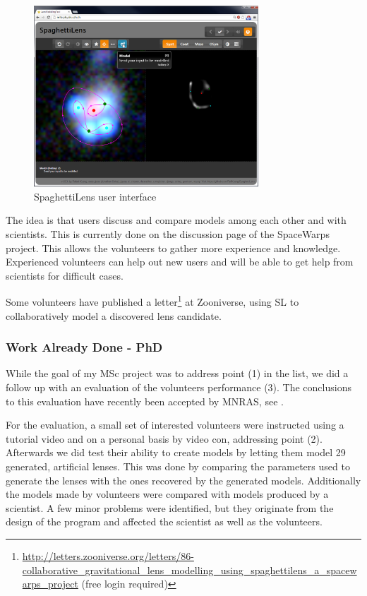 \documentclass[11pt]{article}
\begin{document}
\begin{figure}
	\centering
		\includegraphics[width=0.75\textwidth]{img/client_screen.png}
	\caption{SpaghettiLens user interface}
	\label{fig:client_screen}
\end{figure}


The idea is that users discuss and compare models among each other and with scientists.
This is currently done on the discussion page of the SpaceWarps project.
This allows the volunteers to gather more experience and knowledge.
Experienced volunteers can help out new users and will be able to get help from scientists for difficult cases.

Some volunteers have published a letter\footnote{\url{http://letters.zooniverse.org/letters/86-collaborative_gravitational_lens_modelling_using_spaghettilens_a_spacewarps_project} (free login required)} at Zooniverse, using SL to collaboratively model a discovered lens candidate.


\subsubsection{Work Already Done - PhD}

While the goal of my MSc project was to address point (1) in the list, we did a follow up with an evaluation of the volunteers performance (3).
The conclusions to this evaluation have recently been accepted by MNRAS, see \cite{spaghetti}.

For the evaluation, a small set of interested volunteers were instructed using a tutorial video and on a personal basis by video con, addressing point (2).
Afterwards we did test their ability to create models by letting them model 29 generated, artificial lenses.
This was done by comparing the parameters used to generate the lenses with the ones recovered by the generated models. Additionally the models made by volunteers were compared with models produced by a scientist.
A few minor problems were identified, but they originate from the design of the program and affected the scientist as well as the volunteers.
\end{document}

